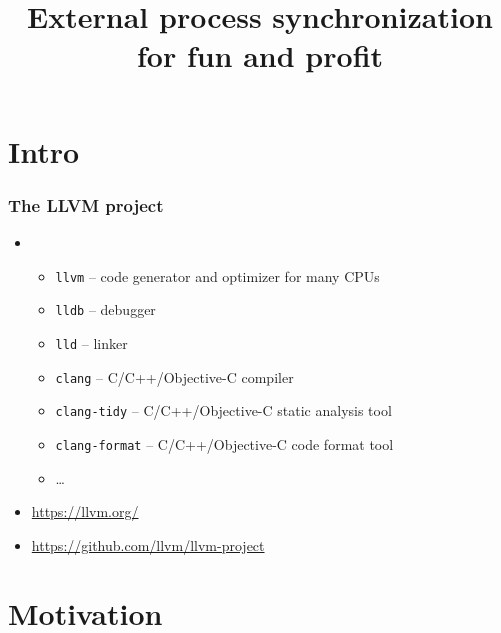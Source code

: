 \documentclass[compress,table,xcolor=table]{beamer}
\newcommand{\shelltext}[1]{\texttt{\colorbox{light-gray}{#1}}}
\begin{document}
\title{External process synchronization\\for fun and profit}
\section{Intro}
\frame{\titlepage}
\begin{frame}
  \frametitle{The LLVM project}
  \begin{itemize}
      \item{\LARGE{}}
        \begin{itemize}
          \item{\shelltext{llvm} -- code generator and optimizer for many CPUs}
          \item{\shelltext{lldb} -- debugger}
          \item{\shelltext{lld} -- linker}
          \item{\shelltext{clang} -- C/C++/Objective-C compiler}
          \item{\shelltext{clang-tidy} -- C/C++/Objective-C static analysis tool}
          \item{\shelltext{clang-format} -- C/C++/Objective-C code format tool}
          \item{\ldots}
        \end{itemize}
      \item{\url{https://llvm.org/}}
      \item{\url{https://github.com/llvm/llvm-project}}
  \end{itemize}
\end{frame}
\section{Motivation}
\end{document}
